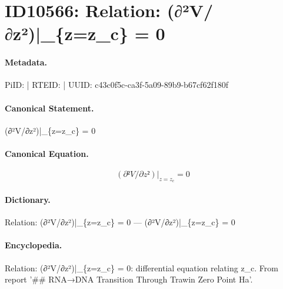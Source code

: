 \section*{ID10566: Relation: (∂²V/∂z²)|\_\{z=z\_c\} = 0}
\paragraph{Metadata.}
PiID:  | RTEID:  | UUID: c43c0f5c-ca3f-5a09-89b9-b67cf62f180f

\paragraph{Canonical Statement.}
(∂²V/∂z²)|\_\{z=z\_c\} = 0

\paragraph{Canonical Equation.}
\[
(∂²V/∂z²)|_{z=z_c} = 0
\]

\paragraph{Dictionary.}
Relation: (∂²V/∂z²)|\_\{z=z\_c\} = 0 — (∂²V/∂z²)|\_\{z=z\_c\} = 0

\paragraph{Encyclopedia.}
Relation: (∂²V/∂z²)|\_\{z=z\_c\} = 0: differential equation relating z\_c. From report '\#\# RNA→DNA Transition Through Trawin Zero Point Ha'.
